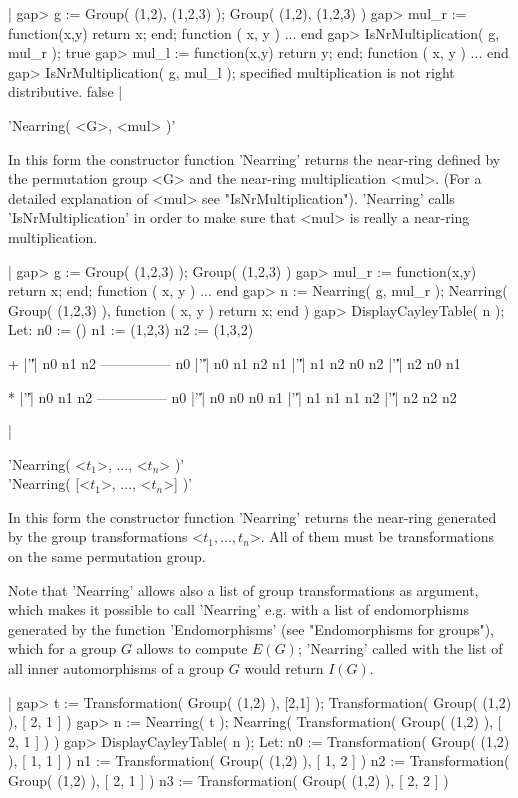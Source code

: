 |  gap> g := Group( (1,2), (1,2,3) );        
  Group( (1,2), (1,2,3) )
  gap> mul_r := function(x,y) return x; end;
  function ( x, y ) ... end
  gap> IsNrMultiplication( g, mul_r );
  true
  gap> mul_l := function(x,y) return y; end;
  function ( x, y ) ... end
  gap> IsNrMultiplication( g, mul_l );      
  specified multiplication is not right distributive.
  false
|

   
'Nearring( <G>, <mul> )' 

In this form the constructor function 'Nearring' returns the near-ring 
defined by the permutation 
group <G> and the near-ring multiplication <mul>. (For a detailed
explanation of <mul> see "IsNrMultiplication"). 'Near\-ring' calls 
'Is\-Nr\-Mul\-ti\-pli\-ca\-tion' 
in order to make sure that <mul> is really a near-ring multiplication.

|  gap> g := Group( (1,2,3) );
  Group( (1,2,3) )
  gap> mul_r := function(x,y) return x; end;
  function ( x, y ) ... end
  gap> n := Nearring( g, mul_r );
  Nearring( Group( (1,2,3) ), function ( x, y )
      return x;
  end )
  gap> DisplayCayleyTable( n );
  Let:
  n0 := ()
  n1 := (1,2,3)
  n2 := (1,3,2)

    +  |'\|'| n0 n1 n2 
   ---------------
    n0 |'\|'| n0 n1 n2 
    n1 |'\|'| n1 n2 n0 
    n2 |'\|'| n2 n0 n1 

    *  |'\|'| n0 n1 n2 
   ---------------
    n0 |'\|'| n0 n0 n0 
    n1 |'\|'| n1 n1 n1 
    n2 |'\|'| n2 n2 n2 

|


'Nearring( <$t_1$>, ..., <$t_n$> )' \\
'Nearring( [<$t_1$>, ..., <$t_n$>] )' 

In this form the constructor function 'Near\-ring' returns the near-ring 
generated by the group 
transformations <$t_1,\dots,t_n$>. All of them must be transformations
on the same permutation group.

Note that 'Near\-ring' allows also a list of group transformations as 
argument, which makes it possible to call
'Nearring' e.g. with a list of endomorphisms generated by the function
'Endo\-mor\-phisms' (see "Endomorphisms for groups"), which for a group 
$G$
allows to compute $E(G)$; 'Near\-ring' called with the list of all
inner automorphisms of a group $G$ would return $I(G)$.

|  gap> t := Transformation( Group( (1,2) ), [2,1] );
  Transformation( Group( (1,2) ), [ 2, 1 ] )
  gap> n := Nearring( t );
  Nearring( Transformation( Group( (1,2) ), [ 2, 1 ] ) ) 
  gap> DisplayCayleyTable( n );
  Let:
  n0 := Transformation( Group( (1,2) ), [ 1, 1 ] )
  n1 := Transformation( Group( (1,2) ), [ 1, 2 ] )
  n2 := Transformation( Group( (1,2) ), [ 2, 1 ] )
  n3 := Transformation( Group( (1,2) ), [ 2, 2 ] )


